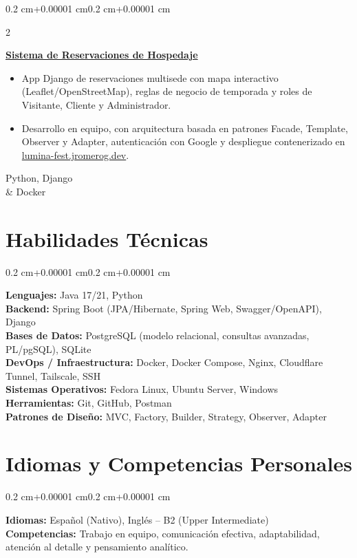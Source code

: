 \documentclass[10pt, letterpaper]{article}
\newenvironment{highlights}{
    \begin{itemize}[
        label={-},
        topsep=0pt,
        parsep=0pt,
        partopsep=0pt,
        itemsep=0pt,
        leftmargin=0.35 cm,
        labelsep=0.15 cm
    ]
}{
    \end{itemize}
}
\newenvironment{onecolentry}{
    \begin{adjustwidth}{0.2 cm+0.00001 cm}{0.2 cm+0.00001 cm}
}{
    \end{adjustwidth}
}
\newenvironment{twocolentry}[2][]{
    \onecolentry
    \def\secondColumn{#2}
    \setcolumnwidth{\fill, 4.5 cm}
    \begin{paracol}{2}
}{
    \switchcolumn \raggedleft \secondColumn
    \end{paracol}
    \endonecolentry
}
\begin{document}
\vspace{0.15 cm}

\begin{twocolentry}{
    Python, Django\\ \& Docker
}
    \textbf{\href{https://github.com/jromerog01/Sistema-Reservaciones-Luciernagas}{Sistema de Reservaciones de Hospedaje}}
    \begin{highlights}
        \item App Django de reservaciones multisede con mapa interactivo (Leaflet/OpenStreetMap), reglas de negocio de temporada y roles de Visitante, Cliente y Administrador.
        \item Desarrollo en equipo, con arquitectura basada en patrones Facade, Template, \mbox{Observer} y Adapter, autenticación con Google y despliegue contenerizado en \mbox{\href{https://lumina-fest.jromerog.dev/}{lumina-fest.jromerog.dev}}.
    \end{highlights}
\end{twocolentry}



\section{Habilidades Técnicas}
\begin{onecolentry}
    \textbf{Lenguajes:} Java 17/21, Python\\
    \textbf{Backend:} Spring Boot (JPA/Hibernate, Spring Web, Swagger/OpenAPI), Django\\
    \textbf{Bases de Datos:} PostgreSQL (modelo relacional, consultas avanzadas, PL/pgSQL), SQLite\\
    \textbf{DevOps / Infraestructura:} Docker, Docker Compose, Nginx, Cloudflare Tunnel, Tailscale, SSH\\
    \textbf{Sistemas Operativos:} Fedora Linux, Ubuntu Server, Windows\\
    \textbf{Herramientas:} Git, GitHub, Postman \\
    \textbf{Patrones de Diseño:} MVC, Factory, Builder, Strategy, Observer, Adapter

\end{onecolentry}

\section{Idiomas y Competencias Personales}
\begin{onecolentry}
    \textbf{Idiomas:} Español (Nativo), Inglés – B2 (Upper Intermediate)\\
    \textbf{Competencias:} Trabajo en equipo, comunicación efectiva, adaptabilidad, atención al detalle y pensamiento analítico.
\end{onecolentry}
\end{document}
